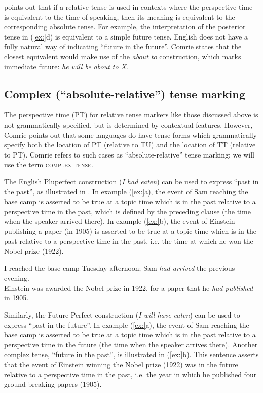 \citet{Comrie1985} points out that if a relative tense is used in contexts where the perspective time is equivalent to the time of speaking, then its meaning is equivalent to the corresponding absolute tense. For example, the interpretation of the posterior tense in (\ref{ex:}d) is equivalent to a simple future tense. English does not have a fully natural way of indicating “future in the future”. Comrie states that the closest equivalent would make use of the \textit{about to} construction, which marks immediate future: \textit{he will be about to X}. 


\subsection{Complex (“absolute-relative”) tense marking}\label{sec:} %

The perspective time (PT) for relative tense markers like those discussed above is not grammatically specified, but is determined by contextual features. However, Comrie points out that some languages do have tense forms which grammatically specify both the location of PT (relative to TU) and the location of TT (relative to PT). Comrie refers to such cases as “absolute-relative” tense marking; we will use the term \textsc{complex tense}.



The English Pluperfect construction (\textit{I had eaten}) can be used to express “past in the past”, as illustrated in . In example (\ref{ex:}a), the event of Sam reaching the base camp is asserted to be true at a topic time which is in the past relative to a perspective time in the past, which is defined by the preceding clause (the time when the speaker arrived there). In example (\ref{ex:}b), the event of Einstein publishing a paper (in 1905) is asserted to be true at a topic time which is in the past relative to a perspective time in the past, i.e. the time at which he won the Nobel prize (1922).


\ea
\ea I reached the base camp Tuesday afternoon; Sam \textit{had arrived} the previous evening.\\
\ex Einstein was awarded the Nobel prize in 1922, for a paper that he \textit{had published}\\
  in 1905.
                       \z
\z


Similarly, the Future Perfect construction (\textit{I will have eaten}) can be used to express “past in the future”. In example (\ref{ex:}a), the event of Sam reaching the base camp is asserted to be true at a topic time which is in the past relative to a perspective time in the future (the time when the speaker arrives there). Another complex tense, “future in the past”, is illustrated in (\ref{ex:}b). This sentence asserts that the event of Einstein winning the Nobel prize (1922) was in the future relative to a perspective time in the past, i.e. the year in which he published four ground-breaking papers (1905).


